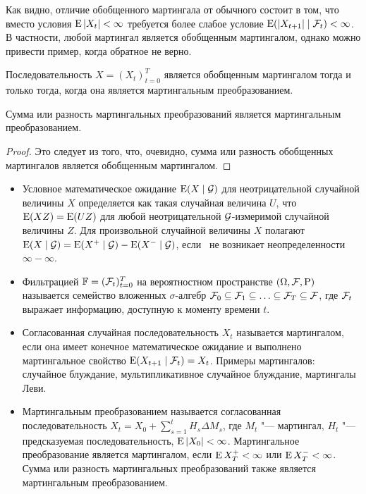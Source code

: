 Как видно, отличие обобщенного мартингала от обычного состоит в том, что вместо условия $\operatorname{E}|X_t|<\infty$ требуется более слабое условие $\operatorname{E}(|X_{t+1}|\mid \mathcal{F}_t) < \infty$. В частности, любой мартингал является обобщенным мартингалом, однако можно привести пример, когда обратное не верно.

\begin{proposition}
Последовательность $X=(X_t)_{t=0}^T$ является обобщенным мартингалом тогда и только тогда, когда она является мартингальным преобразованием.
\end{proposition}

\begin{corollary}
Сумма или разность мартингальных преобразований является мартингальным преобразованием.
\end{corollary}
\begin{proof}
Это следует из того, что, очевидно,  сумма или разность обобщенных мартингалов является обобщенным мартингалом.
\end{proof}

\summary

\begin{itemize}
\item Условное математическое ожидание $\operatorname{E}(X\mid \mathcal{G})$ для неотрицательной случайной величины $X$ определяется как такая случайная величина $U$, что $\operatorname{E}(XZ) = \operatorname{E}(UZ)$ для любой неотрицательной $\mathcal{G}$-измеримой случайной величины $Z$.
Для произвольной случайной величины $X$ полагают $\operatorname{E}(X\mid\mathcal{G}) = \operatorname{E}(X^+\mid \mathcal{G}) - \operatorname{E}(X^-\mid \mathcal{G})$, если \as\ не возникает неопределенности  $\infty-\infty$.

\item Фильтрацией $\mathbb{F}=(\mathcal{F}_t)_{t=0}^T$ на вероятностном пространстве $(\Omega,\mathcal{F},\mathrm{P})$ называется семейство вложенных $\sigma$-алгебр $\mathcal{F}_0 \subseteq \mathcal{F}_1 \subseteq\ldots \subseteq \mathcal{F}_T \subseteq \mathcal{F}$, где $\mathcal{F}_t$ выражает информацию, доступную к моменту времени $t$.

\item Согласованная случайная последовательность $X_t$ называется мартингалом, если она имеет конечное математическое ожидание и выполнено мартингальное свойство $\operatorname{E}(X_{t+1}\mid \mathcal{F}_t) = X_t$.
Примеры мартингалов: случайное блуждание, мультипликативное случайное блуждание, мартингалы Леви.

\item Мартингальным преобразованием называется согласованная последовательность $X_t = X_0 + \sum_{s=1}^t H_s \Delta M_s$, где $M_t$ "--- мартингал, $H_t$ "--- предсказуемая последовательность, $\operatorname{E}|X_0|<\infty$. Мартингальное преобразование является мартингалом, если $\operatorname{E} X_T^+ < \infty$ или $\operatorname{E} X_T^- < \infty$. Сумма или разность мартингальных преобразований также является мартингальным преобразованием.
\end{itemize}
